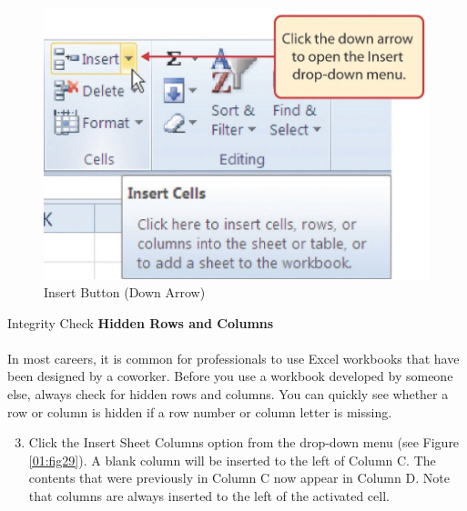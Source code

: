 \begin{figure}[H]
	\centering
	\includegraphics[width=\maxwidth{.95\linewidth}]{gfx/ch01_fig28}
	\caption{Insert Button (Down Arrow)}
	\label{01:fig28}
\end{figure}

\begin{center}
	\begin{infobox}{Integrity Check}
		\textbf{Hidden Rows and Columns}
		\\
		\\
		In most careers, it is common for professionals to use Excel workbooks that have been designed by a coworker. Before you use a workbook developed by someone else, always check for hidden rows and columns. You can quickly see whether a row or column is hidden if a row number or column letter is missing.
	\end{infobox}
\end{center}

\begin{enumerate}
	\setcounter{enumi}{2}

	\item Click the Insert Sheet Columns option from the drop-down menu (see Figure \ref{01:fig29}). A blank column will be inserted to the left of Column \textsf{C}. The contents that were previously in Column \textsf{C} now appear in Column \textsf{D}. Note that columns are always inserted to the left of the activated cell.

\end{enumerate}

